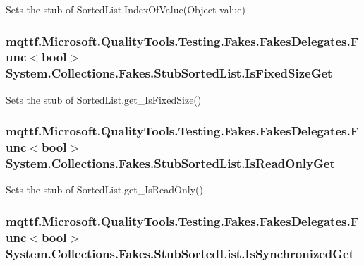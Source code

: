 Sets the stub of Sorted\-List.\-Index\-Of\-Value(\-Object value)

\hypertarget{class_system_1_1_collections_1_1_fakes_1_1_stub_sorted_list_aec4a1c5a6fb735c6d266caa79d82d8cc}{
\subsubsection[{Is\-Fixed\-Size\-Get}]{\setlength{\rightskip}{0pt plus 5cm}mqttf.\-Microsoft.\-Quality\-Tools.\-Testing.\-Fakes.\-Fakes\-Delegates.\-Func$<$bool$>$ System.\-Collections.\-Fakes.\-Stub\-Sorted\-List.\-Is\-Fixed\-Size\-Get}}\label{class_system_1_1_collections_1_1_fakes_1_1_stub_sorted_list_aec4a1c5a6fb735c6d266caa79d82d8cc}


Sets the stub of Sorted\-List.\-get\-\_\-\-Is\-Fixed\-Size()

\hypertarget{class_system_1_1_collections_1_1_fakes_1_1_stub_sorted_list_aa1f72a4053c2b24846222b607f80906f}{
\subsubsection[{Is\-Read\-Only\-Get}]{\setlength{\rightskip}{0pt plus 5cm}mqttf.\-Microsoft.\-Quality\-Tools.\-Testing.\-Fakes.\-Fakes\-Delegates.\-Func$<$bool$>$ System.\-Collections.\-Fakes.\-Stub\-Sorted\-List.\-Is\-Read\-Only\-Get}}\label{class_system_1_1_collections_1_1_fakes_1_1_stub_sorted_list_aa1f72a4053c2b24846222b607f80906f}


Sets the stub of Sorted\-List.\-get\-\_\-\-Is\-Read\-Only()

\hypertarget{class_system_1_1_collections_1_1_fakes_1_1_stub_sorted_list_a4693c05f75f898d44ceaee0595b10485}{
\subsubsection[{Is\-Synchronized\-Get}]{\setlength{\rightskip}{0pt plus 5cm}mqttf.\-Microsoft.\-Quality\-Tools.\-Testing.\-Fakes.\-Fakes\-Delegates.\-Func$<$bool$>$ System.\-Collections.\-Fakes.\-Stub\-Sorted\-List.\-Is\-Synchronized\-Get}}\label{class_system_1_1_collections_1_1_fakes_1_1_stub_sorted_list_a4693c05f75f898d44ceaee0595b10485}


